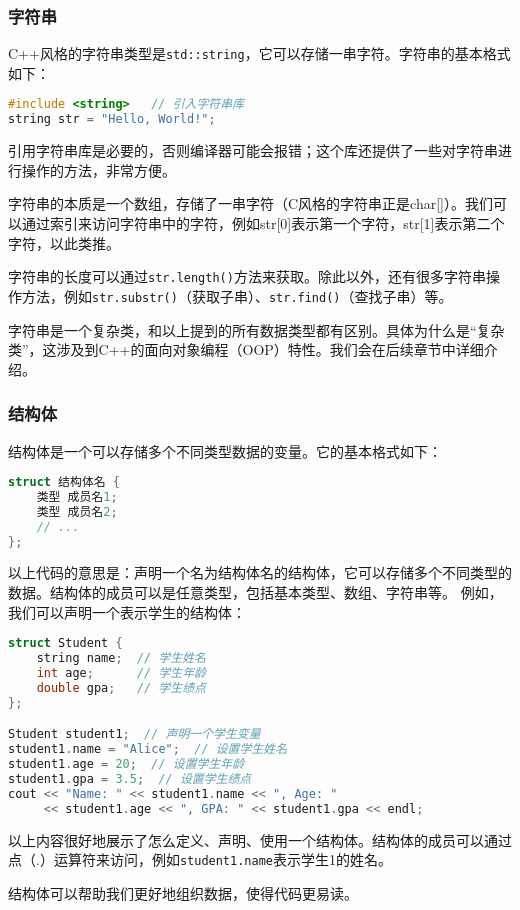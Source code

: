 \documentclass[../main.tex]{subfiles}
\begin{document}
\subsubsection{字符串}
C++风格的字符串类型是\texttt{std::string}，它可以存储一串字符。字符串的基本格式如下：
\begin{lstlisting}[language=C++]
#include <string>   // 引入字符串库
string str = "Hello, World!";
\end{lstlisting}
引用字符串库是必要的，否则编译器可能会报错；这个库还提供了一些对字符串进行操作的方法，非常方便。

字符串的本质是一个数组，存储了一串字符（C风格的字符串正是char[]）。我们可以通过索引来访问字符串中的字符，例如str[0]表示第一个字符，str[1]表示第二个字符，以此类推。

字符串的长度可以通过\texttt{str.length()}方法来获取。除此以外，还有很多字符串操作方法，例如\texttt{str.substr()}（获取子串）、\texttt{str.find()}（查找子串）等。

字符串是一个复杂类，和以上提到的所有数据类型都有区别。具体为什么是“复杂类”，这涉及到C++的面向对象编程（OOP）特性。我们会在后续章节中详细介绍。

\subsubsection{结构体}
结构体是一个可以存储多个不同类型数据的变量。它的基本格式如下：
\begin{lstlisting}[language=C++]
struct 结构体名 {
    类型 成员名1;
    类型 成员名2;
    // ...
};
\end{lstlisting}
以上代码的意思是：声明一个名为结构体名的结构体，它可以存储多个不同类型的数据。结构体的成员可以是任意类型，包括基本类型、数组、字符串等。
例如，我们可以声明一个表示学生的结构体：
\begin{lstlisting}[language=C++]
struct Student {
    string name;  // 学生姓名
    int age;      // 学生年龄
    double gpa;   // 学生绩点
};

Student student1;  // 声明一个学生变量
student1.name = "Alice";  // 设置学生姓名
student1.age = 20;  // 设置学生年龄
student1.gpa = 3.5;  // 设置学生绩点
cout << "Name: " << student1.name << ", Age: "
     << student1.age << ", GPA: " << student1.gpa << endl;
\end{lstlisting}

以上内容很好地展示了怎么定义、声明、使用一个结构体。结构体的成员可以通过点（.）运算符来访问，例如\texttt{student1.name}表示学生1的姓名。

结构体可以帮助我们更好地组织数据，使得代码更易读。
\end{document}
